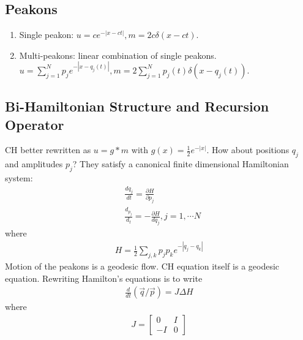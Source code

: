 \documentclass[12pt,reqno]{amsart}
\numberwithin{equation}{section}  %
\newcommand{\p}{\partial}
\begin{document}
\subsection{Peakons} 
\label{ssec:peakons}
\begin{enumerate}
  \item Single peakon: $u = ce^{-| x -ct |}, m = 2 c \delta(x -ct)$.
  \item Multi-peakons: linear combination of single peakons. $u =
    \sum_{j=1}^{N} p_{j}e^{-| x - q_{j}(t) |}, m = 2 \sum_{j
    =1}^{N} p_{j}(t) \delta(x - q_{j}(t))$.
\end{enumerate}

\subsection{Bi-Hamiltonian Structure and Recursion Operator} 
\label{ssec:bi-ham}
CH better rewritten as 
$u = g*m$ with $g(x) = \frac{1}{2}e^{-| x |}$. How about positions
$q_{j}$ and amplitudes $p_{j}$? They satisfy a canonical finite dimensional
Hamiltonian system:%
\begin{equation*}
  \begin{split}
    & \frac{dq_{j}}{dt} = \frac{\p H}{\p p_{j}}
    \\
    & \frac{d _{p_{j}}}{d_{t}} = -\frac{\p H}{d q_{j}}, j = 1, \cdots N
  \end{split}
\end{equation*}
where
\begin{equation*}
  \begin{split}
    H = \frac{1}{2} \sum_{j,k} p_{j} p_{k} e^{-| q_{j} - q_{k} |}
  \end{split}
\end{equation*}
Motion of the peakons is a geodesic flow. CH equation itself is a
geodesic equation. Rewriting Hamilton's equations is to write
%
%
\begin{equation*}
  \begin{split}
    \frac{d}{dt} (\vec{q}/ \vec{p}) = J \Delta H
  \end{split}
\end{equation*}
%
%
where 
%
%
\begin{equation*}
  \begin{split}
    J = 
    \begin{bmatrix}
      0 & I
      \\
      -I & 0
    \end{bmatrix}
  \end{split}
\end{equation*}
\end{document}
